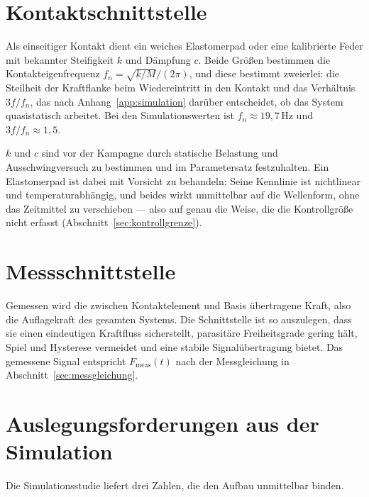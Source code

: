 \documentclass[12pt,a4paper]{report}
\begin{document}
\section{Kontaktschnittstelle}

Als einseitiger Kontakt dient ein weiches Elastomerpad oder eine
kalibrierte Feder mit bekannter Steifigkeit $k$ und Dämpfung $c$. Beide
Größen bestimmen die Kontakteigenfrequenz
$f_n = \sqrt{k/M}/(2\pi)$, und diese bestimmt zweierlei: die Steilheit
der Kraftflanke beim Wiedereintritt in den Kontakt und das Verhältnis
$3f/f_n$, das nach Anhang~\ref{app:simulation} darüber entscheidet, ob
das System quasistatisch arbeitet. Bei den Simulationswerten ist
$f_n \approx 19{,}7\,\mathrm{Hz}$ und $3f/f_n \approx 1{,}5$.

$k$ und $c$ sind vor der Kampagne durch statische Belastung und
Ausschwingversuch zu bestimmen und im Parametersatz festzuhalten. Ein
Elastomerpad ist dabei mit Vorsicht zu behandeln: Seine Kennlinie ist
nichtlinear und temperaturabhängig, und beides wirkt unmittelbar auf die
Wellenform, ohne das Zeitmittel zu verschieben --- also auf genau die
Weise, die die Kontrollgröße nicht erfasst
(Abschnitt~\ref{sec:kontrollgrenze}).

\section{Messschnittstelle}

Gemessen wird die zwischen Kontaktelement und Basis übertragene Kraft,
also die Auflagekraft des gesamten Systems. Die Schnittstelle ist so
auszulegen, dass sie einen eindeutigen Kraftfluss sicherstellt,
parasitäre Freiheitsgrade gering hält, Spiel und Hysterese vermeidet und
eine stabile Signalübertragung bietet. Das gemessene Signal entspricht
$F_{\mathrm{meas}}(t)$ nach der Messgleichung in
Abschnitt~\ref{sec:messgleichung}.

\section{Auslegungsforderungen aus der Simulation}
\label{sec:auslegung-sim}

Die Simulationsstudie liefert drei Zahlen, die den Aufbau unmittelbar
binden.
\end{document}
